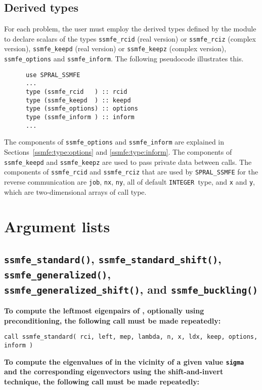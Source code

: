 \subsection{Derived types}
For each problem, the user must employ the derived types defined by the
module to declare scalars of the types 
{\tt ssmfe\_rcid} (real version) or 
{\tt ssmfe\_rciz} (complex version), 
{\tt ssmfe\_keepd} (real version) or
{\tt ssmfe\_keepz} (complex version),
{\tt ssmfe\_options} and 
{\tt ssmfe\_inform}.
The following pseudocode illustrates this.
\begin{verbatim}
      use SPRAL_SSMFE    
      ...
      type (ssmfe_rcid   ) :: rcid
      type (ssmfe_keepd  ) :: keepd
      type (ssmfe_options) :: options
      type (ssmfe_inform ) :: inform
      ...
\end{verbatim}

The components of 
{\tt ssmfe\_options} and 
{\tt ssmfe\_inform} are explained
in Sections~\ref{ssmfe:type:options} and \ref{ssmfe:type:inform}. 
The components of {\tt ssmfe\_keepd} and {\tt ssmfe\_keepz} 
are used to pass 
private data between calls. 
The components of
{\tt ssmfe\_rcid} and 
{\tt ssmfe\_rciz} 
that are used by \texttt{SPRAL\_SSMFE}
for the reverse communication are
{\tt job},
{\tt nx},
{\tt ny}, all of default \texttt{INTEGER}\ type,
and
{\tt x} and {\tt y},
which are 
two-dimensional arrays
of call type.


\section{Argument lists}

\subsection{%
   \texttt{ssmfe\_standard()},
   \texttt{ssmfe\_standard\_shift()},
   \texttt{ssmfe\_generalized()},\\
   \texttt{ssmfe\_generalized\_shift()}, and
   \texttt{ssmfe\_buckling()}
}

{\bf
To compute
the leftmost eigenpairs of ,
optionally using preconditioning,
the following call must be made repeatedly:
}

\medskip
{\tt call
ssmfe\_standard( rci, left, mep, lambda, n, x, ldx, keep, options, inform )
}

\medskip
\noindent
{\bf
To compute the eigenvalues of  %
in the vicinity of 
a given value {\tt sigma}
and the corresponding eigenvectors using the shift-and-invert technique,
the following call must be made repeatedly:
}

